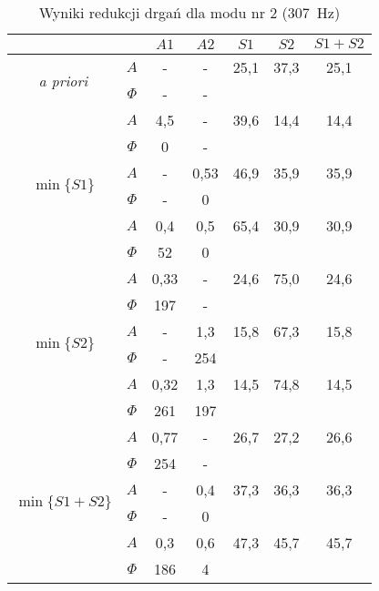 \documentclass[polish,a4paper,11pt]{mwart}
\begin{document}
  \begin{table}[!tbh]
    \centering
    \caption{Wyniki redukcji drgań dla modu nr 2 (\SI{307}{\hertz})}
    \label{tab:red2}
    \begin{tabular}{|c|c|c|c|c|c|c|}
      \cline{3-7}
      \multicolumn{2}{c|}{}&$A1$&$A2$&$S1$&$S2$&$S1+S2$\\\hline
      \multirow{2}{*}{\textit{a priori}} & $A$ & - & - & 25,1 & 37,3 & 25,1\\\cline{2-7}
					 & $\Phi$ & - & - & \multicolumn{3}{c}{}\\\hline
      \multirow{6}{*}{$\min\{S1\}$}   &   $A$ & 4,5 & - & 39,6 & 14,4 & 14,4\\\cline{2-7}
				      &$\Phi$ & 0 & - & \multicolumn{3}{c}{}\\\cline{2-7}
				      &   $A$ & - & 0,53 & 46,9 & 35,9 & 35,9\\\cline{2-7}
				      &$\Phi$ & - & 0 & \multicolumn{3}{c}{}\\\cline{2-7}
				      &   $A$ & 0,4 & 0,5 & 65,4 & 30,9 & 30,9\\\cline{2-7}
				      &$\Phi$ & 52 & 0 & \multicolumn{3}{c}{}\\\hline
      \multirow{6}{*}{$\min\{S2\}$}   &   $A$ & 0,33 & - & 24,6 & 75,0 & 24,6\\\cline{2-7}
				      &$\Phi$ & 197 & - & \multicolumn{3}{c}{}\\\cline{2-7}
				      &   $A$ & - & 1,3 & 15,8 & 67,3 & 15,8\\\cline{2-7}
				      &$\Phi$ & - & 254 & \multicolumn{3}{c}{}\\\cline{2-7}
				      &   $A$ & 0,32 & 1,3 & 14,5 & 74,8 & 14,5\\\cline{2-7}
				      &$\Phi$ & 261 & 197 & \multicolumn{3}{c}{}\\\hline
      \multirow{6}{*}{$\min\{S1+S2\}$}&   $A$ & 0,77 & - & 26,7 & 27,2 & 26,6\\\cline{2-7}
				      &$\Phi$ & 254 & - & \multicolumn{3}{c}{}\\\cline{2-7}
				      &   $A$ & - & 0,4 & 37,3 & 36,3 & 36,3\\\cline{2-7}
				      &$\Phi$ & - & 0 & \multicolumn{3}{c}{}\\\cline{2-7}
				      &   $A$ & 0,3 & 0,6 & 47,3 & 45,7 & 45,7\\\cline{2-7}
				      &$\Phi$ & 186 & 4 & \multicolumn{3}{c}{}\\\cline{1-4}
    \end{tabular}
  \end{table}
\end{document}
